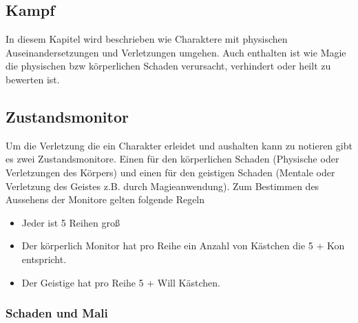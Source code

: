 \documentclass{article}
\begin{document}
\begin{center}
\section{Kampf}
\end{center}

In diesem Kapitel wird beschrieben wie Charaktere mit physischen Auseinandersetzungen und Verletzungen umgehen. Auch
enthalten ist wie Magie die physischen bzw körperlichen Schaden verursacht, verhindert oder heilt zu bewerten ist.

\begin{center}
\subsection{Zustandsmonitor}
\end{center}

Um die Verletzung die ein Charakter erleidet und aushalten kann zu notieren gibt es zwei Zustandsmonitore. Einen für
den körperlichen Schaden (Physische oder Verletzungen des Körpers) und einen für den geistigen Schaden (Mentale oder
Verletzung des Geistes z.B. durch Magieanwendung). Zum Bestimmen des Aussehens der Monitore gelten folgende Regeln

\begin{itemize}
\item Jeder ist 5 Reihen groß
\item Der körperlich Monitor hat pro Reihe ein Anzahl von Kästchen die 5 + Kon entspricht.
\item Der Geistige hat pro Reihe 5 + Will Kästchen.
\end{itemize}

\subsubsection{Schaden und Mali}
\end{document}

